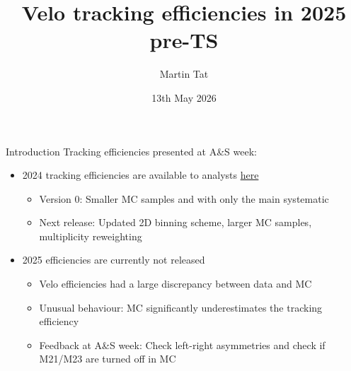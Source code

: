 \documentclass[xcolor={dvipsnames}]{beamer}
\title[Heidelberg tracking meeting]{Velo tracking efficiencies in 2025 pre-TS}
\author[Martin Tat]{Martin Tat}
\institute[Heidelberg]{Heidelberg University}
\date{13th May 2026}
\begin{document}
\begin{frame}
  \titlepage
\end{frame}


\begin{frame}{Introduction}
  \vspace{0.0cm}
  {\Large Tracking efficiencies presented at A\&S week:}
  \vspace{0.2cm}
  \begin{itemize}
    \setlength\itemsep{1.0em}
    \item{2024 tracking efficiencies are available to analysts \href{https://gitlab.cern.ch/lhcb-rta/tracking-efficiencies-run-3}{here}}
    \begin{itemize}
      \item[-]{Version 0: Smaller MC samples and with only the main systematic}
      \item[-]{Next release: Updated 2D binning scheme, larger MC samples, multiplicity reweighting}
    \end{itemize}
    \item{2025 efficiencies are currently not released}
    \begin{itemize}
      \item[-]{Velo efficiencies had a large discrepancy between data and MC}
      \item[-]{Unusual behaviour: MC significantly underestimates the tracking efficiency}
      \item[-]{Feedback at A\&S week: Check left-right asymmetries and check if M21/M23 are turned off in MC}
    \end{itemize}
  \end{itemize}
\end{frame}
\end{document}
